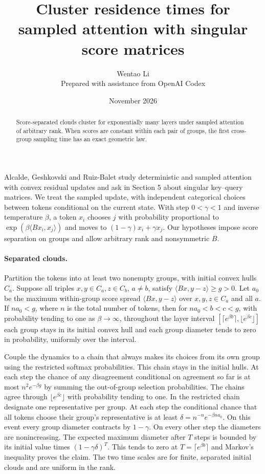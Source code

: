 \documentclass[10pt]{article}
\title{Cluster residence times for sampled attention with singular score matrices}
\author{Wentao Li\\{\small Prepared with assistance from OpenAI Codex}}
\date{November 2026}
\begin{document}
\maketitle
\begin{abstract}
Score-separated clouds cluster for exponentially many layers under sampled attention of arbitrary rank. When scores are constant within each pair of groups, the first cross-group sampling time has an exact geometric law.
\end{abstract}
Alcalde, Geshkovski and Ruiz-Balet study deterministic and sampled attention with convex residual updates and ask in Section 5 about singular key--query matrices. We treat the sampled update, with independent categorical choices between tokens conditional on the current state. With step $0<\gamma<1$ and inverse temperature $\beta$, a token $x_i$ chooses $j$ with probability proportional to $\exp(\beta\langle Bx_i,x_j\rangle)$ and moves to $(1-\gamma)x_i+\gamma x_j$. Our hypotheses impose score separation on groups and allow arbitrary rank and nonsymmetric $B$.

\paragraph{Separated clouds.} Partition the tokens into at least two nonempty groups, with initial convex hulls $C_a$. Suppose all triples $x,y\in C_a,z\in C_b$, $a\ne b$, satisfy $\langle Bx,y-z\rangle\ge g>0$. Let $a_0$ be the maximum within-group score spread $\langle Bx,y-z\rangle$ over $x,y,z\in C_a$ and all $a$. If $na_0<g$, where $n$ is the total number of tokens, then for $na_0<b<c<g$, with probability tending to one as $\beta\to\infty$, throughout the layer interval $[\lceil e^{\beta b}\rceil,\lfloor e^{\beta c}\rfloor]$ each group stays in its initial convex hull and each group diameter tends to zero in probability, uniformly over the interval.

Couple the dynamics to a chain that always makes its choices from its own group using the restricted softmax probabilities. This chain stays in the initial hulls. At each step the chance of any disagreement conditional on agreement so far is at most $n^2 e^{-\beta g}$ by summing the out-of-group selection probabilities. The chains agree through $\lfloor e^{\beta c}\rfloor$ with probability tending to one. In the restricted chain designate one representative per group. At each step the conditional chance that all tokens choose their group's representative is at least $\delta=n^{-n}e^{-\beta n a_0}$. On this event every group diameter contracts by $1-\gamma$. On every other step the diameters are nonincreasing. The expected maximum diameter after $T$ steps is bounded by its initial value times $(1-\gamma\delta)^T$. This tends to zero at $T=\lceil e^{\beta b}\rceil$ and Markov's inequality proves the claim. The two time scales are for finite, separated initial clouds and are uniform in the rank.
\end{document}
